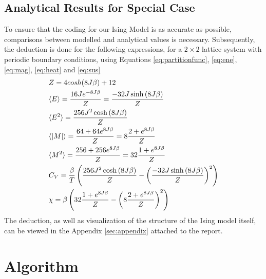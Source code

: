 \documentclass[10pt, nofootinbib, twocolumn]{revtex4-1}
\begin{document}
\subsection{Analytical Results for Special Case} \label{sec:analytical}
To ensure that the coding for our Ising Model is as accurate as possible, comparisons between modelled and analytical values is necessary. Subsequently, the deduction is done for the following expressions, for a $2\times 2$ lattice system with periodic boundary conditions, using Equations \eqref{eq:partitionfunc}, \eqref{eq:ene}, \eqref{eq:mag}, \eqref{eq:heat} and \eqref{eq:sus}
\begin{align}
& Z=4cosh(8J\beta)+12 \label{eq:anpar} \\
& \langle E \rangle = \frac{16J e^{-8J\beta}}{Z} = \frac{-32J\sinh{\left(8J\beta\right)}}{Z} \label{eq:anene} \\
& \langle E^2 \rangle = \frac{256J^2\cosh{\left(8J\beta\right)}}{Z} \label{eq:anene2} \\
& \langle \abs{M} \rangle = \frac{64 + 64e^{8J\beta}}{Z} = 8\frac{2 + e^{8J\beta}}{Z}  \label{eq:anmag} \\
& \langle M^2 \rangle = \frac{256 + 256e^{8J\beta}}{Z} = 32\frac{1 + e^{8J\beta}}{Z} \label{eq:anmag2} \\
& C_V = \frac{\beta}{T}\left(\frac{256J^2\cosh{\left( 8J\beta \right)}}{Z} - \left(\frac{-32J\sinh{\left( 8J\beta \right)}}{Z}\right)^2\right)  \label{eq:ancritchi} \\
& \chi = \beta\left(32\frac{1+e^{8J\beta}}{Z} - \left(8\frac{2+e^{8J\beta}}{Z}\right)^2\right) \label{eq:ancritchi2} \\
\end{align}
The deduction, as well as visualization of the structure of the Ising model itself, can be viewed in the Appendix \ref{sec:appendix} attached to the report. 


\cleardoublepage
\section{Algorithm}\label{sec:algorithm}
\end{document}
